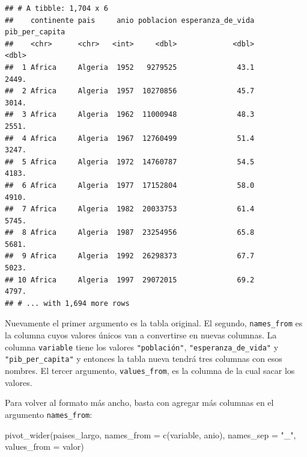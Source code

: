 \documentclass[
  openany]{book}
\newenvironment{Shaded}{\begin{snugshade}}{\end{snugshade}}
\newcommand{\AttributeTok}[1]{\textcolor[rgb]{0.77,0.63,0.00}{#1}}
\newcommand{\FunctionTok}[1]{\textcolor[rgb]{0.00,0.00,0.00}{#1}}
\newcommand{\NormalTok}[1]{#1}
\newcommand{\StringTok}[1]{\textcolor[rgb]{0.31,0.60,0.02}{#1}}
\begin{document}
\begin{verbatim}
## # A tibble: 1,704 x 6
##    continente pais     anio poblacion esperanza_de_vida pib_per_capita
##    <chr>      <chr>   <int>     <dbl>             <dbl>          <dbl>
##  1 Africa     Algeria  1952   9279525              43.1          2449.
##  2 Africa     Algeria  1957  10270856              45.7          3014.
##  3 Africa     Algeria  1962  11000948              48.3          2551.
##  4 Africa     Algeria  1967  12760499              51.4          3247.
##  5 Africa     Algeria  1972  14760787              54.5          4183.
##  6 Africa     Algeria  1977  17152804              58.0          4910.
##  7 Africa     Algeria  1982  20033753              61.4          5745.
##  8 Africa     Algeria  1987  23254956              65.8          5681.
##  9 Africa     Algeria  1992  26298373              67.7          5023.
## 10 Africa     Algeria  1997  29072015              69.2          4797.
## # ... with 1,694 more rows
\end{verbatim}

Nuevamente el primer argumento es la tabla original.
El segundo, \texttt{names\_from} es la columna cuyos valores únicos van a convertirse en nuevas columnas.
La columna \texttt{variable} tiene los valores \texttt{"población"}, \texttt{"esperanza\_de\_vida"} y \texttt{"pib\_per\_capita"} y entonces la tabla nueva tendrá tres columnas con esos nombres.
El tercer argumento, \texttt{values\_from}, es la columna de la cual sacar los valores.

Para volver al formato más ancho, basta con agregar más columnas en el argumento \texttt{names\_from}:

\begin{Shaded}
\begin{Highlighting}[]
\FunctionTok{pivot\_wider}\NormalTok{(paises\_largo, }
            \AttributeTok{names\_from =} \FunctionTok{c}\NormalTok{(variable, anio), }
            \AttributeTok{names\_sep =} \StringTok{"\_"}\NormalTok{,}
            \AttributeTok{values\_from =}\NormalTok{ valor)}
\end{Highlighting}
\end{Shaded}
\end{document}
